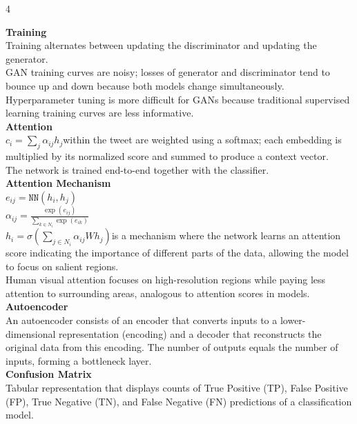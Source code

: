 \documentclass[8pt]{extarticle}
\begin{document}
\scriptsize
\begin{multicols}{4}

\vspace{2pt}\textbf{Training}\\
Training alternates between updating the discriminator and updating the generator.\\
GAN training curves are noisy; losses of generator and discriminator tend to bounce up and down because both models change simultaneously.\\
Hyperparameter tuning is more difficult for GANs because traditional supervised learning training curves are less informative.\\
\vspace{2pt}\textbf{Attention}\\
$c_i = \sum_{j} \alpha_{ij} h_j$\Words within the tweet are weighted using a softmax; each embedding is multiplied by its normalized score and summed to produce a context vector.\\
The network is trained end-to-end together with the classifier.\\
\vspace{2pt}\textbf{Attention Mechanism}\\
$e_{ij} = \texttt{NN}(h_i, h_j)$\\
$\alpha_{ij} = \frac{\exp(e_{ij})}{\sum_{k \in N_i} \exp(e_{ik})}$\\
$h_i = \sigma\left( \sum_{j \in N_i} \alpha_{ij} W h_j \right)$\Attention is a mechanism where the network learns an attention score indicating the importance of different parts of the data, allowing the model to focus on salient regions.\\
Human visual attention focuses on high-resolution regions while paying less attention to surrounding areas, analogous to attention scores in models.\\
\vspace{2pt}\textbf{Autoencoder}\\
An autoencoder consists of an encoder that converts inputs to a lower-dimensional representation (encoding) and a decoder that reconstructs the original data from this encoding. The number of outputs equals the number of inputs, forming a bottleneck layer.\\
\vspace{2pt}\textbf{Confusion Matrix}\\
Tabular representation that displays counts of True Positive (TP), False Positive (FP), True Negative (TN), and False Negative (FN) predictions of a classification model.\\

\end{multicols}
\end{document}
